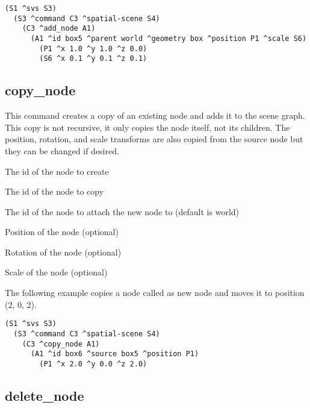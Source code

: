 \begin{verbatim}
(S1 ^svs S3)
  (S3 ^command C3 ^spatial-scene S4)
    (C3 ^add_node A1)
      (A1 ^id box5 ^parent world ^geometry box ^position P1 ^scale S6)
        (P1 ^x 1.0 ^y 1.0 ^z 0.0)
        (S6 ^x 0.1 ^y 0.1 ^z 0.1)
\end{verbatim}


\subsection{copy\_node}

This command creates a copy of an existing node and adds it to the scene graph.
This copy is not recursive, it only copies the node itself, not its children.
The position, rotation, and scale transforms are also copied from the source node
but they can be changed if desired.

\begin{description}
	\item{} The id of the node to create
	\item{} The id of the node to copy
	\item{} The id of the node to attach the new node to (default is world)
	\item{} Position of the node (optional)
	\item{} Rotation of the node (optional)
	\item{} Scale of the node (optional)
\end{description}

The following example copies a node called  as new node 
and moves it to position (2, 0, 2).

\begin{verbatim}
(S1 ^svs S3)
  (S3 ^command C3 ^spatial-scene S4)
    (C3 ^copy_node A1)
      (A1 ^id box6 ^source box5 ^position P1)
        (P1 ^x 2.0 ^y 0.0 ^z 2.0)
\end{verbatim}


\subsection{delete\_node}

